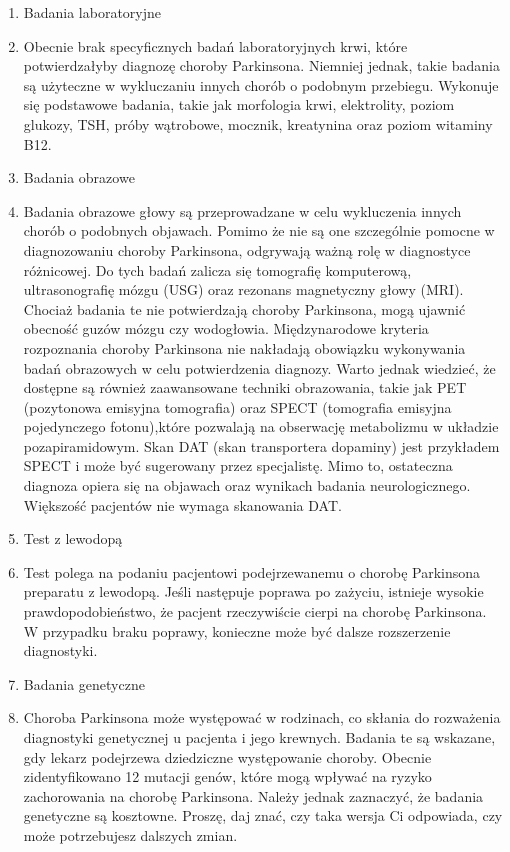 \renewcommand{\labelenumi}{\alph{enumi})}
\begin{enumerate}
	\item Badania laboratoryjne
	\item[] Obecnie brak specyficznych badań laboratoryjnych krwi, które potwierdzałyby diagnozę choroby Parkinsona.
Niemniej jednak, takie badania są użyteczne w wykluczaniu innych chorób o podobnym przebiegu.
Wykonuje się podstawowe badania, takie jak morfologia krwi, elektrolity, poziom glukozy, TSH, próby wątrobowe, mocznik, kreatynina oraz poziom witaminy B12.

	\item Badania obrazowe
	\item[] Badania obrazowe głowy są przeprowadzane w celu wykluczenia innych chorób o podobnych objawach.
Pomimo że nie są one szczególnie pomocne w diagnozowaniu choroby Parkinsona, odgrywają ważną rolę w diagnostyce różnicowej.
Do tych badań zalicza się tomografię komputerową, ultrasonografię mózgu (USG) oraz rezonans magnetyczny głowy (MRI). Chociaż badania te nie potwierdzają choroby Parkinsona, mogą ujawnić obecność guzów mózgu czy wodogłowia.
Międzynarodowe kryteria rozpoznania choroby Parkinsona nie nakładają obowiązku wykonywania badań obrazowych w celu potwierdzenia diagnozy.
Warto jednak wiedzieć, że dostępne są również zaawansowane techniki obrazowania, takie jak PET (pozytonowa emisyjna tomografia) oraz SPECT (tomografia emisyjna pojedynczego fotonu),które pozwalają na obserwację metabolizmu w układzie pozapiramidowym. Skan DAT (skan transportera dopaminy) jest przykładem SPECT i może być sugerowany przez specjalistę.
Mimo to, ostateczna diagnoza opiera się na objawach oraz wynikach badania neurologicznego. Większość pacjentów nie wymaga skanowania DAT.


	\item Test z lewodopą
	\item[]Test polega na podaniu pacjentowi podejrzewanemu o chorobę Parkinsona preparatu z lewodopą.
Jeśli następuje poprawa po zażyciu, istnieje wysokie prawdopodobieństwo, że pacjent rzeczywiście cierpi na chorobę Parkinsona.
W przypadku braku poprawy, konieczne może być dalsze rozszerzenie diagnostyki.

	\item Badania genetyczne
	\item[]Choroba Parkinsona może występować w rodzinach, co skłania do rozważenia diagnostyki genetycznej u pacjenta i jego krewnych.
Badania te są wskazane, gdy lekarz podejrzewa dziedziczne występowanie choroby.
Obecnie zidentyfikowano 12 mutacji genów, które mogą wpływać na ryzyko zachorowania na chorobę Parkinsona.
Należy jednak zaznaczyć, że badania genetyczne są kosztowne.
Proszę, daj znać, czy taka wersja Ci odpowiada, czy może potrzebujesz dalszych zmian.



\end{enumerate}
